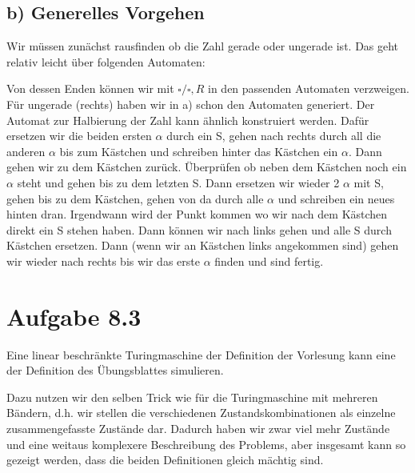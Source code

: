 \documentclass{article}
\begin{document}
\subsection*{b) Generelles Vorgehen}
Wir müssen zunächst rausfinden ob die Zahl gerade oder ungerade ist. Das geht relativ leicht über folgenden Automaten:
\begin{center}
\end{center}
Von dessen Enden können wir mit $\square/\square,R$ in den passenden Automaten verzweigen. Für ungerade (rechts) haben wir in a) schon den Automaten generiert. Der Automat zur Halbierung der Zahl kann ähnlich konstruiert werden. Dafür ersetzen wir die beiden ersten $\alpha$ durch ein S, gehen nach rechts durch all die anderen $\alpha$ bis zum Kästchen und schreiben hinter das Kästchen ein $\alpha$. Dann gehen wir zu dem Kästchen zurück. Überprüfen ob neben dem Kästchen noch ein $\alpha$ steht und gehen bis zu dem letzten S. Dann ersetzen wir wieder 2 $\alpha$ mit S, gehen bis zu dem Kästchen, gehen von da durch alle $\alpha$ und schreiben ein neues hinten dran. Irgendwann wird der Punkt kommen wo wir nach dem Kästchen direkt ein S stehen haben. Dann können wir nach links gehen und alle S durch Kästchen ersetzen. Dann (wenn wir an Kästchen links angekommen sind) gehen wir wieder nach rechts bis wir das erste $\alpha$ finden und sind fertig.

\section*{Aufgabe 8.3}
Eine linear beschränkte Turingmaschine der Definition der Vorlesung kann eine der Definition des Übungsblattes simulieren. 

Dazu nutzen wir den selben Trick wie für die Turingmaschine mit mehreren Bändern, d.h. wir stellen die verschiedenen Zustandskombinationen als einzelne zusammengefasste Zustände dar. Dadurch haben wir zwar viel mehr Zustände und eine weitaus komplexere Beschreibung des Problems, aber insgesamt kann so gezeigt werden, dass die beiden Definitionen gleich mächtig sind.
\end{document}
